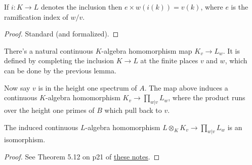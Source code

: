 \begin{lemma} If $i:K\to L$ denotes the inclusion then $e\times w(i(k))=v(k)$, where
  $e$ is the ramification index of $w/v$.
  \label{IsDedekindDomain.HeightOneSpectrum.valuation_comap}
  \leanok
\end{lemma}
\begin{proof}
  \leanok
  Standard (and formalized).
\end{proof}

\begin{definition}
  \label{IsDedekindDomain.HeightOneSpectrum.adicCompletionComapAlgHom}
  \leanok
  There's a natural continuous $K$-algebra homomorphism map $K_v\to L_w$. It is defined by completing
  the inclusion $K\to L$ at the finite places $v$ and $w$, which can be done
  by the previous lemma.
\end{definition}

Now say $v$ is in the height one spectrum of $A$. The map above induces a continuous
$K$-algebra homomorphism $K_v\to\prod_{w|v}L_w$, where the product runs over the height one
primes of $B$ which pull back to $v$.

\begin{theorem}
  \label{IsDedekindDomain.HeightOneSpectrum.adicCompletionComapAlgEquiv}
  The induced continuous $L$-algebra homomorphism $L\otimes_KK_v\to\prod_{w|v}L_w$ is an isomorphism.
\end{theorem}
\begin{proof}
  See Theorem 5.12 on p21 of \href{https://math.berkeley.edu/~ltomczak/notes/Mich2022/LF_Notes.pdf}
  {these notes}.
\end{proof}


